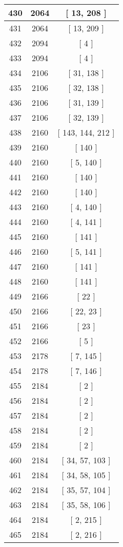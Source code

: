 \begin{center}
\begin{longtable}[H]{|| c c c ||}
\hline
430 & 2064 & [ 13, 208 ] \\ 
\hline
431 & 2064 & [ 13, 209 ] \\ 
\hline
432 & 2094 & [ 4 ] \\ 
\hline
433 & 2094 & [ 4 ] \\ 
\hline
434 & 2106 & [ 31, 138 ] \\ 
\hline
435 & 2106 & [ 32, 138 ] \\ 
\hline
436 & 2106 & [ 31, 139 ] \\ 
\hline
437 & 2106 & [ 32, 139 ] \\ 
\hline
438 & 2160 & [ 143, 144, 212 ] \\ 
\hline
439 & 2160 & [ 140 ] \\ 
\hline
440 & 2160 & [ 5, 140 ] \\ 
\hline
441 & 2160 & [ 140 ] \\ 
\hline
442 & 2160 & [ 140 ] \\ 
\hline
443 & 2160 & [ 4, 140 ] \\ 
\hline
444 & 2160 & [ 4, 141 ] \\ 
\hline
445 & 2160 & [ 141 ] \\ 
\hline
446 & 2160 & [ 5, 141 ] \\ 
\hline
447 & 2160 & [ 141 ] \\ 
\hline
448 & 2160 & [ 141 ] \\ 
\hline
449 & 2166 & [ 22 ] \\ 
\hline
450 & 2166 & [ 22, 23 ] \\ 
\hline
451 & 2166 & [ 23 ] \\ 
\hline
452 & 2166 & [ 5 ] \\ 
\hline
453 & 2178 & [ 7, 145 ] \\ 
\hline
454 & 2178 & [ 7, 146 ] \\ 
\hline
455 & 2184 & [ 2 ] \\ 
\hline
456 & 2184 & [ 2 ] \\ 
\hline
457 & 2184 & [ 2 ] \\ 
\hline
458 & 2184 & [ 2 ] \\ 
\hline
459 & 2184 & [ 2 ] \\ 
\hline
460 & 2184 & [ 34, 57, 103 ] \\ 
\hline
461 & 2184 & [ 34, 58, 105 ] \\ 
\hline
462 & 2184 & [ 35, 57, 104 ] \\ 
\hline
463 & 2184 & [ 35, 58, 106 ] \\ 
\hline
464 & 2184 & [ 2, 215 ] \\ 
\hline
465 & 2184 & [ 2, 216 ] \\ 

\end{longtable}
\end{center}
